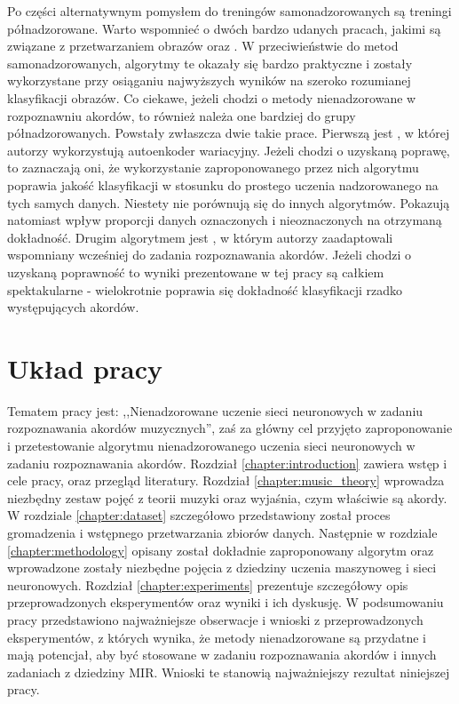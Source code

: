 Po części alternatywnym pomysłem do treningów samonadzorowanych są treningi półnadzorowane. Warto wspomnieć o dwóch bardzo udanych pracach, jakimi są związane z przetwarzaniem obrazów \cite{xie_self-training_2020} oraz \cite{pham_meta_2021}. W przeciwieństwie do metod samonadzorowanych, algorytmy te okazały się bardzo praktyczne i zostały wykorzystane przy osiąganiu najwyższych wyników na szeroko rozumianej klasyfikacji obrazów. Co ciekawe, jeżeli chodzi o metody nienadzorowane w rozpoznawniu akordów, to również należa one bardziej do grupy półnadzorowanych. Powstały zwłaszcza dwie takie prace. Pierwszą jest \cite{wu_semi-supervised_2020}, w której autorzy wykorzystują autoenkoder wariacyjny. Jeżeli chodzi o uzyskaną poprawę, to zaznaczają oni, że wykorzystanie zaproponowanego przez nich algorytmu poprawia jakość klasyfikacji w stosunku do prostego uczenia nadzorowanego na tych samych danych. Niestety nie porównują się do innych algorytmów. Pokazują natomiast wpływ proporcji danych oznaczonych i nieoznaczonych na otrzymaną dokładność. Drugim algorytmem jest \cite{bortolozzo_improving_2021}, w którym autorzy zaadaptowali wspomniany wcześniej \cite{xie_self-training_2020} do zadania rozpoznawania akordów. Jeżeli chodzi o uzyskaną poprawność to wyniki prezentowane w tej pracy są całkiem spektakularne - wielokrotnie poprawia się dokładność klasyfikacji rzadko występujących akordów.



\section{Układ pracy}

Tematem pracy jest: ,,Nienadzorowane uczenie sieci neuronowych w zadaniu rozpoznawania akordów muzycznych'', zaś za główny cel przyjęto zaproponowanie i przetestowanie algorytmu nienadzorowanego uczenia sieci neuronowych w zadaniu rozpoznawania akordów. Rozdział \ref{chapter:introduction} zawiera wstęp i cele pracy, oraz przegląd literatury. Rozdział \ref{chapter:music_theory} wprowadza niezbędny zestaw pojęć z teorii muzyki oraz wyjaśnia, czym właściwie są akordy. W rozdziale \ref{chapter:dataset} szczegółowo przedstawiony został proces gromadzenia i wstępnego przetwarzania zbiorów danych. Następnie w rozdziale \ref{chapter:methodology} opisany został dokładnie zaproponowany algorytm oraz wprowadzone zostały niezbędne pojęcia z dziedziny uczenia maszynoweg i sieci neuronowych. Rozdział \ref{chapter:experiments} prezentuje szczegółowy opis przeprowadzonych eksperymentów oraz wyniki i ich dyskusję. W podsumowaniu pracy przedstawiono najważniejsze obserwacje i wnioski z przeprowadzonych eksperymentów, z których wynika, że metody nienadzorowane są przydatne i mają potencjał, aby być stosowane w zadaniu rozpoznawania akordów i innych zadaniach z dziedziny MIR. Wnioski te stanowią najważniejszy rezultat niniejszej pracy.
